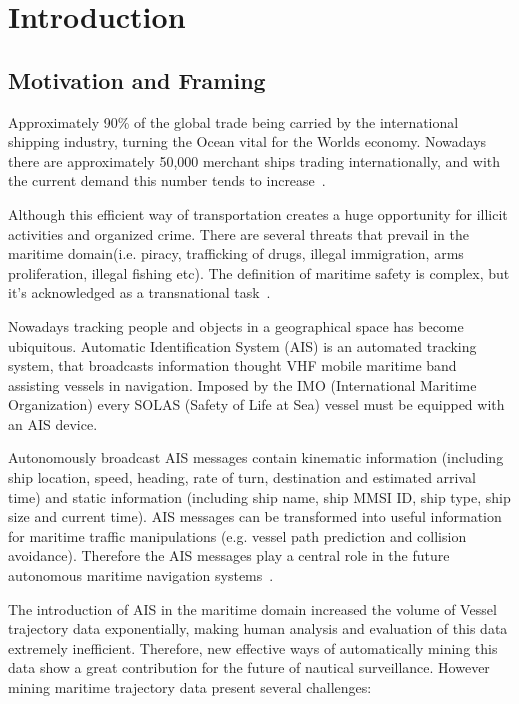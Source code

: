 \chapter{Introduction}
\label{chapter:introduction}

\section{Motivation and Framing}
Approximately 90\% of the global trade being carried by the international shipping industry, turning the Ocean vital for the Worlds economy.
Nowadays there are approximately 50,000 merchant ships trading internationally, and with the current demand this number tends to increase~\cite{ICS}.

Although this efficient way of transportation creates a huge opportunity for illicit activities and organized crime.
There are several threats that prevail in the maritime domain(i.e. piracy, trafficking of drugs, illegal immigration, arms proliferation, illegal fishing etc). The definition of maritime safety is complex, but it's acknowledged as a transnational task~\cite{Bueger2015}.

Nowadays tracking people and objects in a geographical space has become ubiquitous.
Automatic Identification System (AIS)\label{label_AIS} is an automated tracking system, that broadcasts information thought VHF mobile maritime band assisting vessels in navigation. 
Imposed by the IMO (International Maritime Organization)\label{label_IMO} every SOLAS
(Safety of Life at Sea) \label{label_SOLAS} vessel must be equipped with an AIS device.

Autonomously broadcast AIS messages contain kinematic information (including ship location, speed, heading, rate of turn, destination and estimated arrival time) and static information (including ship name, ship MMSI ID, ship type, ship size and current time). AIS messages can be transformed into useful information for maritime traffic manipulations (e.g. vessel path prediction and collision avoidance). Therefore the AIS messages play a central role in the future autonomous maritime navigation systems~\cite{Mao2016}.

The introduction of AIS in the maritime domain increased the volume of Vessel trajectory data exponentially, making human analysis and evaluation of this data extremely inefficient. Therefore, new effective ways of automatically mining this data show a great contribution for the future of nautical surveillance. However mining maritime trajectory data present several challenges: 

